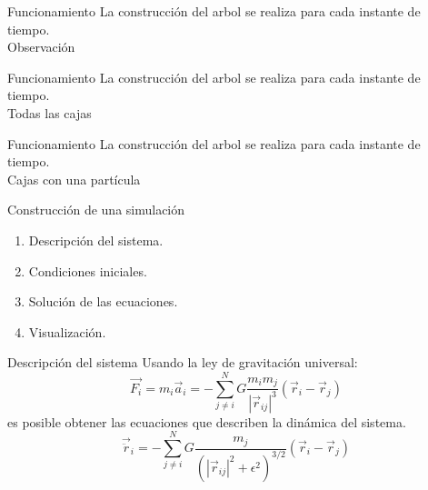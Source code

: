 \documentclass{beamer}
\begin{document}
\begin{frame}{Funcionamiento}
	La construcci\'on del arbol se realiza para cada instante de tiempo.
	\centering
	\\
	Observaci\'on
\end{frame}
\begin{frame}{Funcionamiento}
	La construcci\'on del arbol se realiza para cada instante de tiempo.
	\centering
	\\
	Todas las cajas
\end{frame}
\begin{frame}{Funcionamiento}
	La construcci\'on del arbol se realiza para cada instante de tiempo.
	\centering
	\\
	Cajas con una part\'icula
\end{frame}
\begin{frame}{Construcci\'on de una simulaci\'on}
	\begin{enumerate}
		\item Descripci\'on del sistema. \pause
		\item Condiciones iniciales. \pause
		\item Soluci\'on de las ecuaciones. \pause
		\item Visualizaci\'on.
	\end{enumerate}
\end{frame}
\begin{frame}{Descripci\'on del sistema}
	Usando la ley de gravitaci\'on universal:
	\begin{equation}
		\vec{F_i} = m_i\vec{a}_i = - \sum\limits_{j\neq i}^N G\dfrac{m_im_j}{|\vec{r}_{ij}|^3}\left(\vec{r}_i - \vec{r}_j\right)
	\end{equation}\pause
	es posible obtener las ecuaciones que describen la din\'amica del sistema.\pause
	\begin{equation}
		\vec{\ddot{r}}_i = - \sum\limits_{j\neq i}^N G\dfrac{m_j}{\left(|\vec{r}_{ij}|^2 + \epsilon^2\right)^{3/2}}\left(\vec{r}_i - \vec{r}_j\right)
	\end{equation}
\end{frame}
\end{document}
